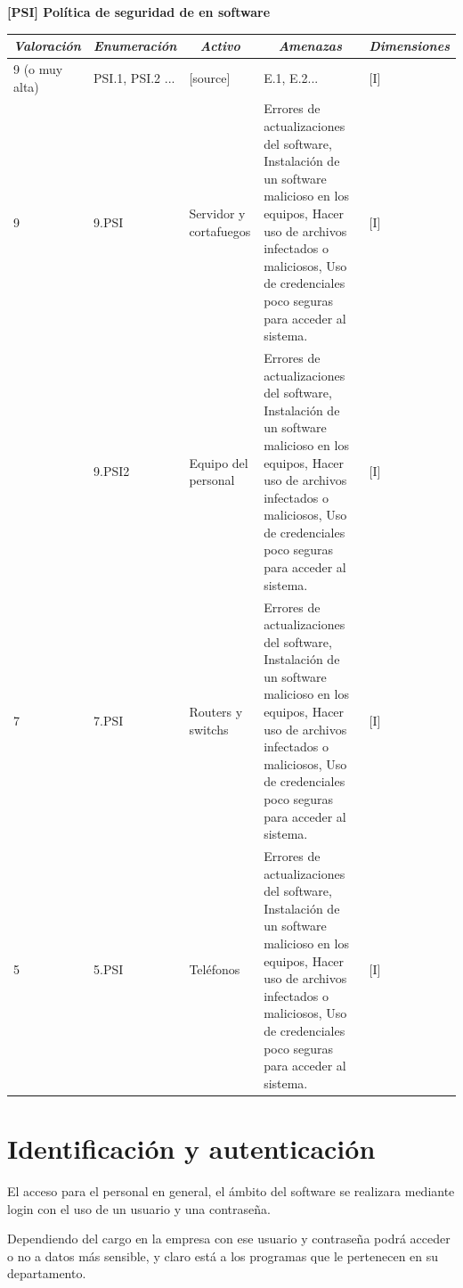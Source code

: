 \documentclass[11pt,bibtotoc,noliststotoc,BCOR0mm]{scrbook}
\newcommand{\cellcenter}[1]{\multicolumn{1}{c}{#1}}
\newcommand{\thead}[1]{\textbf{\emph{#1}}}
\begin{document}
\begin{center}
  \centering
  \vspace*{\fill}
	\textbf{[PSI] Política de seguridad de en software}
  \vspace*{1cm}
  \begin{tabular}{|m{}|m{}|m{}|m{}|m{}|}
    \cellcenter{\thead{Valoración}} & \cellcenter{\thead{Enumeración}} & \cellcenter{\thead{Activo}} 
& \cellcenter{\thead{Amenazas}} & \cellcenter{\thead{Dimensiones}} \\ \hline
    9 (o muy alta) & PSI.1, PSI.2 ... & [source] & E.1, E.2... & [I] \\ \hline
    9 & 9.PSI & Servidor y cortafuegos & Errores de actualizaciones del software, Instalación  de un software malicioso en los equipos, Hacer uso de archivos infectados o maliciosos, Uso de credenciales poco seguras para acceder al sistema. & [I] \\ \hline
      & 9.PSI2 & Equipo del personal &Errores de actualizaciones del software, Instalación  de un software malicioso en los equipos, Hacer uso de archivos infectados o maliciosos, Uso de credenciales poco seguras para acceder al sistema.& [I] \\ \hline
    7 & 7.PSI & Routers y switchs & Errores de actualizaciones del software, Instalación  de un software malicioso en los equipos, Hacer uso de archivos infectados o maliciosos, Uso de credenciales poco seguras para acceder al sistema.  & [I] \\ \hline
    5 & 5.PSI & Teléfonos & Errores de actualizaciones del software, Instalación  de un software malicioso en los equipos, Hacer uso de archivos infectados o maliciosos, Uso de credenciales poco seguras para acceder al sistema. & [I] \\ \hline
  \end{tabular}
\end{center}

\section{Identificación y autenticación}

El acceso para el personal en general, el ámbito del software se realizara mediante login con el uso de un usuario y una contraseña. 


Dependiendo del cargo en la empresa con ese usuario y contraseña podrá acceder o no a datos más sensible, y claro está a los programas que le pertenecen en su departamento.
\end{document}
